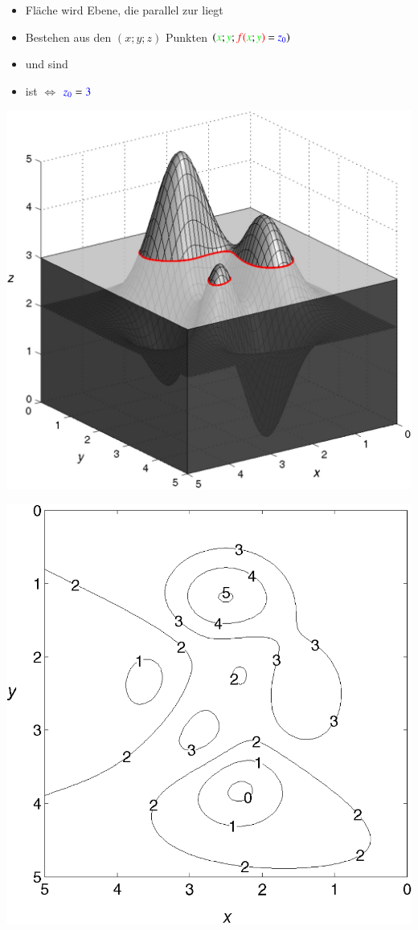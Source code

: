 

    \textbf{}
    \begin{itemize}
        \item Fläche wird  Ebene, die parallel zur  liegt
        \item Bestehen aus den $(x;y;z)$ Punkten $({\color{green}x} ; {\color{green}y} ; {\color{red}f(}{\color{green}x};{\color{green}y}{\color{red})} \text{ = } {\color{blue}z_0})$
        \item {} und  sind 
        \item {} ist  $\Leftrightarrow$ ${{\color{blue}z_0} = {\color{blue}3}}$
    \end{itemize} 


\begin{minipage}[t]{0.48\columnwidth}
    \includegraphics[width=\columnwidth]{images/niveaulinien1.png}
\end{minipage}
\hfill
\begin{minipage}[t]{0.48\columnwidth}
    \includegraphics[width=\columnwidth]{images/niveaulinien2.png}
\end{minipage}